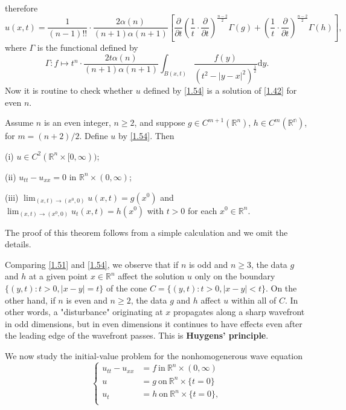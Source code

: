 therefore 
\begin{equation}\label{1.54}
u\left( x,t \right) =\frac{1}{\left( n-1 \right) !!}\cdot \frac{2\alpha \left( n \right)}{\left( n+1 \right) \alpha \left( n+1 \right)}\left[ \frac{\partial}{\partial t}\left( \frac{1}{t}\cdot \frac{\partial}{\partial t} \right) ^{\frac{n-2}{2}}\Gamma \left( g \right) +\left( \frac{1}{t}\cdot \frac{\partial}{\partial t} \right) ^{\frac{n-2}{2}}\Gamma \left( h \right) \right] ,
\end{equation}
where $\Gamma$ is the functional defined by 
$$
\Gamma :f\mapsto t^n\cdot \frac{2t\alpha \left( n \right)}{\left( n+1 \right) \alpha \left( n+1 \right)}\int_{B\left( x,t \right)}{\frac{f\left( y \right)}{\left( t^2-\left| y-x \right|^2 \right) ^{\frac{1}{2}}}\mathrm{d}y}.
$$
Now it is routine to check whether $u$ defined by \eqref{1.54} is a solution of \eqref{1.42} for even $n$.
\begin{theorem}
Assume $n$ is an even integer, $n\ge 2$, and suppose $g\in C^{m+1}(\mathbb{R}^n)$, $h\in C^m(\mathbb{R^n})$, for $m=(n+2)/2$. Define $u$ by \eqref{1.54}. Then \par
(i) $u\in C^2(\mathbb{R}^n\times[0,\infty))$;\par
(ii) $u_{tt}-u_{xx}=0$ in $\mathbb{R}^n\times(0,\infty)$;\par
(iii) $\lim_{(x,t)\to (x^0,0)}u(x,t)=g(x^0)$ and $\lim_{(x,t)\to (x^0,0)}u_t(x,t)=h(x^0)$ with $t>0$ for each $x^0\in\mathbb{R}^n$.
\end{theorem}
The proof of this theorem follows from a simple calculation and we omit the details.\par
Comparing \eqref{1.51} and \eqref{1.54}, we observe that if $n$ is odd and $n\ge 3$, the data $g$ and $h$ at a given point $x\in\mathbb{R}^n$ affect the solution $u$ only on the boundary $\{(y,t):t>0,|x-y|=t\}$ of the cone $C=\{(y,t):t>0,|x-y|<t\}$. On the other hand, if $n$ is even and $n\ge 2$, the data $g$ and $h$ affect $u$ within all of $C$. In other words, a "disturbance" originating at $x$ propagates along a sharp wavefront in odd dimensions, but in even dimensions it continues to have effects even after the leading edge of the wavefront passes. This is \textbf{Huygens' principle}.\par
We now study the initial-value problem for the nonhomogenerous wave equation
\begin{equation}\label{1.55}
\left\{ \begin{aligned}
	u_{tt}-u_{xx}&=f\ \text{in}\ \mathbb{R}^n\times(0,\infty)\\
	u&=g\ \text{on}\ \mathbb{R}^n\times\{t=0\}\\
	u_t&=h\ \text{on}\ \mathbb{R}^n\times\{t=0\},\\
\end{aligned} \right. 
\end{equation}
